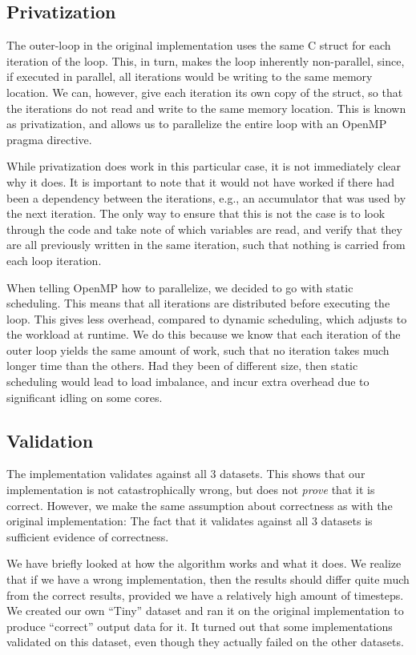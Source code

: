\documentclass[11pt]{article}
\begin{document}
\subsection{Privatization}
The outer-loop in the original implementation uses the same C 
struct for each
iteration of the loop. This, in turn, makes the loop inherently non-parallel, since,
if executed in parallel, all iterations would be writing to the same memory location. 
We can, however, give each iteration its own copy of the
struct, so that the iterations do not read and write to the same memory location. This is 
known as privatization, and allows us to parallelize the entire loop
with an OpenMP pragma directive. 

While privatization does work in this particular case, it is not immediately clear why it does. It is
important to note that it would not have worked if there had been a dependency between the iterations,
e.g., an accumulator that was used by the next iteration. The only way to ensure
that this is not the case is to look through the code and take note of which 
variables are read, and verify that they are all previously written in the 
same iteration, such that nothing is carried from each loop iteration.

When telling OpenMP how to parallelize, we decided to go with static scheduling.
This means that all iterations are distributed before executing the loop. This gives
less overhead, compared to dynamic scheduling, which adjusts to the workload at runtime. We do
this because we know that each iteration of the outer loop yields the same
amount of work, such that no iteration takes much longer time than the others.
Had they been of different size, then static scheduling would lead to load 
imbalance, and incur extra overhead due to significant idling on some cores.


\subsection{Validation}
The implementation validates against all 3 datasets. This shows that our
implementation is not catastrophically wrong, but does not \emph{prove} that it is
correct. However, we make the same assumption about correctness as with the 
original implementation: The fact that it validates against all 3 datasets is sufficient evidence of correctness.

We have briefly looked at how the algorithm works and what it does. We
realize that if we have a wrong implementation, then the results should differ quite much from the correct results, provided we have a relatively high amount of timesteps. We created our own ``Tiny'' dataset and ran it on the original implementation to produce ``correct'' output data for it. It turned out that some implementations validated on this dataset, even though they actually failed on the other datasets.
\end{document}
